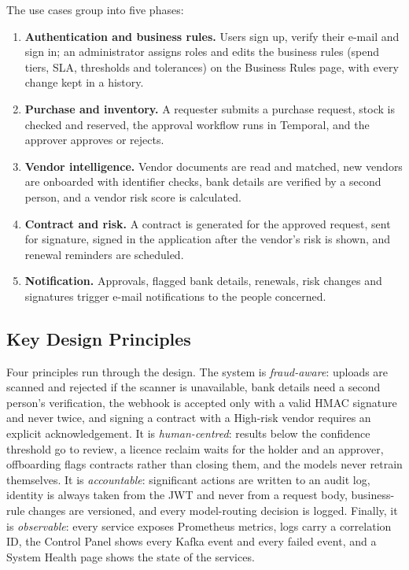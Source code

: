 The use cases group into five phases:
\begin{enumerate}
  \item \textbf{Authentication and business rules.} Users sign up, verify their e-mail and sign in; an administrator assigns roles and edits the business rules (spend tiers, SLA, thresholds and tolerances) on the Business Rules page, with every change kept in a history.
  \item \textbf{Purchase and inventory.} A requester submits a purchase request, stock is checked and reserved, the approval workflow runs in Temporal, and the approver approves or rejects.
  \item \textbf{Vendor intelligence.} Vendor documents are read and matched, new vendors are onboarded with identifier checks, bank details are verified by a second person, and a vendor risk score is calculated.
  \item \textbf{Contract and risk.} A contract is generated for the approved request, sent for signature, signed in the application after the vendor's risk is shown, and renewal reminders are scheduled.
  \item \textbf{Notification.} Approvals, flagged bank details, renewals, risk changes and signatures trigger e-mail notifications to the people concerned.
\end{enumerate}

\subsection{Key Design Principles}
Four principles run through the design. The system is \emph{fraud-aware}: uploads are scanned and rejected if the scanner is unavailable, bank details need a second person's verification, the webhook is accepted only with a valid HMAC signature and never twice, and signing a contract with a High-risk vendor requires an explicit acknowledgement. It is \emph{human-centred}: results below the confidence threshold go to review, a licence reclaim waits for the holder and an approver, offboarding flags contracts rather than closing them, and the models never retrain themselves. It is \emph{accountable}: significant actions are written to an audit log, identity is always taken from the JWT and never from a request body, business-rule changes are versioned, and every model-routing decision is logged. Finally, it is \emph{observable}: every service exposes Prometheus metrics, logs carry a correlation ID, the Control Panel shows every Kafka event and every failed event, and a System Health page shows the state of the services.

